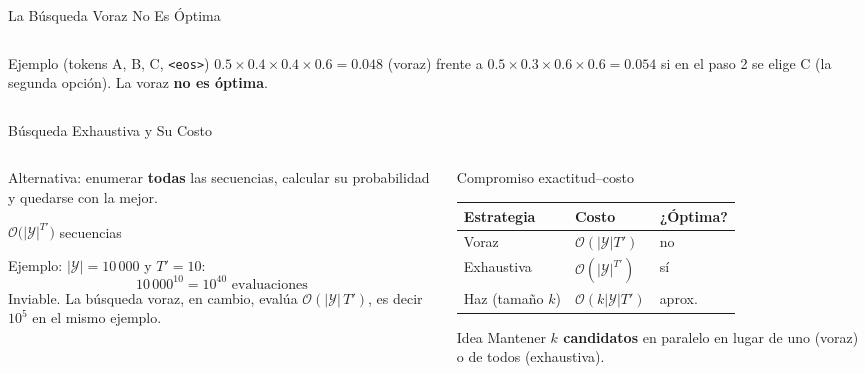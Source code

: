\documentclass[aspectratio=169, 10pt]{beamer}
\newcommand{\tok}[1]{\texttt{#1}}
\newcommand{\eos}{\tok{<eos>}}
\newcommand{\formula}[1]{%
	\begin{tcolorbox}[colback=UCMBlue!8, colframe=UCMBlue, arc=4pt,
		boxsep=2pt, left=6pt, right=6pt, top=3pt, bottom=3pt]
		#1
	\end{tcolorbox}
}
\begin{document}
\begin{frame}{La B\'usqueda Voraz No Es \'Optima}
\begin{columns}[T]
\begin{column}{0.47\textwidth}
			\vspace{0.1cm}
			\begin{alertblock}{Ejemplo (tokens A, B, C, \eos)}
				\scriptsize
				$0.5\times0.4\times0.4\times0.6 = 0.048$ (voraz) frente a $0.5\times0.3\times0.6\times0.6 = 0.054$ si en el paso 2 se elige C (la segunda opci\'on). La voraz \textbf{no es \'optima}.
			\end{alertblock}
		\end{column}
	\end{columns}

\end{frame}

\begin{frame}{B\'usqueda Exhaustiva y Su Costo}

	\begin{columns}[T]
		\begin{column}{0.5\textwidth}
			\small
			Alternativa: enumerar \textbf{todas} las secuencias, calcular su probabilidad y quedarse con la mejor.
			\formula{\centering $\mathcal{O}\big(|\mathcal{Y}|^{T'}\big)$ secuencias}
			Ejemplo: $|\mathcal{Y}| = 10\,000$ y $T'=10$:
			\[ 10\,000^{10} = 10^{40} \text{ evaluaciones} \]
			Inviable. La b\'usqueda voraz, en cambio, eval\'ua $\mathcal{O}(|\mathcal{Y}|\,T')$, es decir $10^{5}$ en el mismo ejemplo.
		\end{column}

		\begin{column}{0.47\textwidth}
			\begin{block}{Compromiso exactitud--costo}
				\small
				\renewcommand{\arraystretch}{1.2}
				\begin{tabular}{@{}lll@{}}
					\toprule
					Estrategia & Costo & ¿\'Optima? \\
					\midrule
					Voraz & $\mathcal{O}(|\mathcal{Y}|T')$ & no \\
					Exhaustiva & $\mathcal{O}(|\mathcal{Y}|^{T'})$ & s\'i \\
					Haz (tama\~no $k$) & $\mathcal{O}(k|\mathcal{Y}|T')$ & aprox. \\
					\bottomrule
				\end{tabular}
			\end{block}
			\begin{alertblock}{Idea}
				\small
				Mantener \textbf{$k$ candidatos} en paralelo en lugar de uno (voraz) o de todos (exhaustiva).
			\end{alertblock}
		\end{column}
	\end{columns}

\end{frame}
\end{document}
